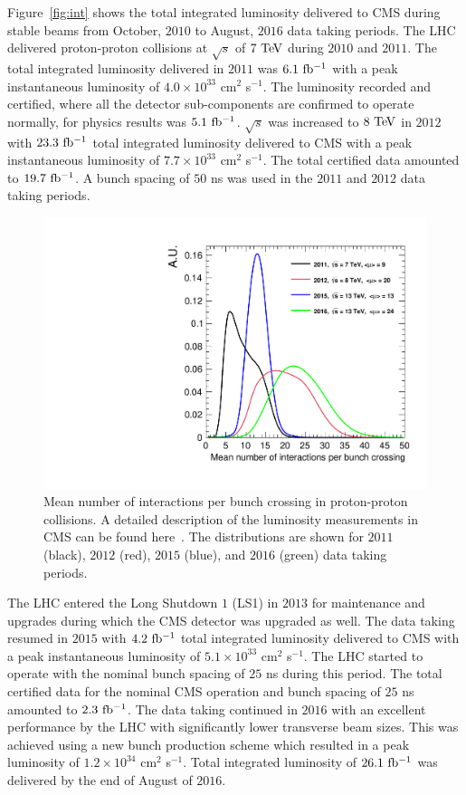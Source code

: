 Figure~\ref{fig:int} shows the total integrated luminosity delivered to CMS during stable beams from October, $2010$ to August, $2016$ data taking periods. The LHC delivered proton-proton collisions at $\sqrt{s}$ of $7~\mathrm{Te\kern -0.1em V}$ during $2010$ and $2011$. The total integrated luminosity delivered in $2011$ was $6.1~\mathrm{fb^{-1}}$ with a peak instantaneous luminosity of $4.0 \times 10^{33}$ cm$^2$ s$^{-1}$. The luminosity recorded and certified, where all the detector sub-components are confirmed to operate normally, for physics results was $5.1~\mathrm{fb^{-1}}$. $\sqrt{s}$ was increased to $8~\mathrm{Te\kern -0.1em V}$ in $2012$ with $23.3~\mathrm{fb^{-1}}$ total integrated luminosity delivered to CMS with a peak instantaneous luminosity of $7.7 \times 10^{33}$ cm$^2$ s$^{-1}$. The total certified data amounted to $19.7~\mathrm{fb^{-1}}$. A bunch spacing of $50$ ns was used in the $2011$ and $2012$ data taking periods. 

\begin{figure}[h]
\centering
\includegraphics[width=0.6\columnwidth]{figures_chapter2/pileup_cms}
\caption{Mean number of interactions per bunch crossing in proton-proton collisions. A detailed description of the  luminosity measurements in CMS can be found here~\cite{CMS-PAS-LUM-13-001,CMS-PAS-LUM-15-001}. The distributions are shown for $2011$ (black), $2012$ (red), $2015$ (blue), and $2016$ (green) data taking periods.}
\label{fig:pu}
\end{figure} 

The LHC entered the Long Shutdown $1$ (LS1) in $2013$ for maintenance and upgrades during which the CMS detector was upgraded as well. The data taking resumed in $2015$ with $4.2~\mathrm{fb^{-1}}$ total integrated luminosity delivered to CMS with a peak instantaneous luminosity of $5.1 \times 10^{33}$ cm$^2$ s$^{-1}$. The LHC started to operate with the nominal bunch spacing of $25$ ns during this period. The total certified data for the nominal CMS operation and bunch spacing of $25$ ns amounted to $2.3~\mathrm{fb^{-1}}$. The data taking continued in $2016$ with an excellent performance by the LHC with significantly lower transverse beam sizes. This was achieved using a new bunch production scheme which resulted in a peak luminosity of  $1.2 \times 10^{34}$ cm$^2$ s$^{-1}$. Total integrated luminosity of $26.1~\mathrm{fb^{-1}}$ was delivered by the end of August of $2016$.   

